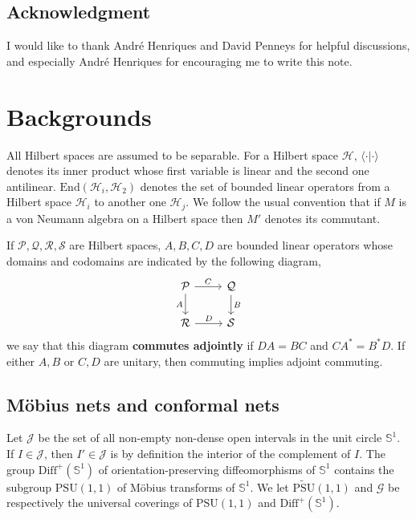 \documentclass[11pt,b5paper,notitlepage]{article}
\theoremstyle{definition}
\theoremstyle{plain}
\newcommand{\mc}{\mathcal}
\newcommand{\End}{\mathrm{End}} %
\newcommand{\Diffp}{\mathrm{Diff}^+}
\newcommand{\PSU}{\mathrm{PSU}(1,1)}
\newcommand{\bk}[1]{\langle {#1}\rangle}
\newcommand{\scr}{\mathscr}
\newcommand{\mbb}{\mathbb}
\newcommand{\UPSU}{\widetilde{\mathrm{PSU}}(1,1)}
\numberwithin{equation}{section}
\begin{document}
\subsection*{Acknowledgment}

I would like to thank Andr\'e Henriques and David Penneys for helpful discussions, and especially Andr\'e Henriques for encouraging me to write this note.

	
	
	
	
	



	
\section{Backgrounds}\label{lb18}


All Hilbert spaces are assumed to be separable.	For a Hilbert space $\mc H$, $\bk{\cdot|\cdot}$ denotes its inner product whose first variable is linear and the second one antilinear. $\End(\mc H_i,\mc H_2)$ denotes the set of bounded linear operators from a Hilbert space $\mc H_i$ to another one $\mc H_j$. We follow the usual convention that if $M$ is a von Neumann algebra on a Hilbert space then $M'$ denotes its commutant.

If $\mc P,\mc Q,\mc R,\mc S$ are Hilbert spaces, $A,B,C,D$ are bounded linear operators whose domains and codomains are indicated by the following diagram,
\begin{equation}
	\begin{tikzcd}
		\mc P \arrow[r, "C"] \arrow[d, "A"'] & \mc Q \arrow[d, "B"]\\
		\mc R\arrow[r, "D"] &\mc S
	\end{tikzcd}
\end{equation}
we say that this diagram \textbf{commutes adjointly} if $DA=BC$ and $CA^*=B^*D$. If either $A,B$ or $C,D$ are unitary, then commuting implies adjoint commuting.

\subsection*{M\"obius nets and conformal nets}


	
Let $\mc J$ be the set of all non-empty non-dense open intervals in the unit circle $\mbb S^1$. If $I\in\mc J$, then $I'\in\mc J$ is by definition the interior of the complement of $I$. The group $\Diffp(\mbb S^1)$ of orientation-preserving diffeomorphisms of $\mbb S^1$ contains the subgroup $\PSU$ of M\"obius transforms of $\mbb S^1$. We let $\UPSU$ and $\scr G$ be respectively the universal coverings of $\PSU$ and $\Diffp(\mbb S^1)$. 
\end{document}
